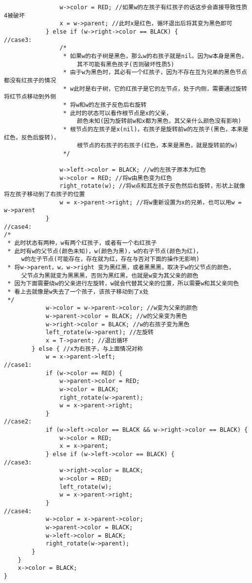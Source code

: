 \begin{verbatim}
                w->color = RED; //如果w的左孩子有红孩子的话这步会直接导致性质4被破坏
                x = w->parent; //此时x是红色，循环退出后将其变为黑色即可
            } else if (w->right->color == BLACK) {
//case3:
                /*
                 * 如果w的右子树是黑色，那么w的右孩子就是nil。因为w本身是黑色，
                     其不可能有黑色孩子(否则破坏性质5)
                 * 由于w为黑色时，其必有一个红孩子，因为不存在互为兄弟的黑色节点都没有红孩子的情况
                 * w此时是右子树，它的红孩子是它的左节点，处于内侧，需要通过旋转将红节点移动到外侧
                 * 将w和w的左孩子反色后右旋转
                 * 此时的状态可以看作根节点是x的父亲，
                     颜色未知(因为旋转前w和x都为黑色，其父亲什么颜色没有影响)
                 * 根节点的左孩子是x(nil)，右孩子是旋转前w的左孩子(黑色，本来是红色，反色后旋转)，
                     根节点的右孩子的右孩子(红色，本来是黑色，就是旋转前的w)
                 */

                w->left->color = BLACK; //w的左孩子原本为红色
                w->color = RED; //将w由黑色变为红色
                right_rotate(w); //将w点和其左孩子反色然后右旋转，形状上就像将左孩子移动到了右孩子的位置
                w = x->parent->right; //将w重新设置为x的兄弟，也可以用w = w->parent
            }
//case4:
/*
 * 此时状态有两种，w有两个红孩子，或者有一个右红孩子
 * 此时有w的父节点(颜色未知)，w(颜色为黑)，w的右子节点(颜色为红)，
     w的左子节点(可能存在，存在就为红，存在与否对下面的操作无影响)
 * 将w->parent，w，w->right 变为黑红黑，或者黑黑黑，取决于w的父节点的颜色，
     父节点为黑就变为黑黑黑，否则为黑红黑，也就是w变为其父亲的颜色
 * 因为下面需要绕w的父亲进行左旋转，w就会代替其父亲的位置，所以需要w和其父亲同色
 * 看上去就像是w失去了一个孩子，该孩子移动到了x处
 */
            w->color = w->parent->color; //w变为父亲的颜色
            w->parent->color = BLACK; //w的父亲变为黑色
            w->right->color = BLACK; //w的右孩子变为黑色
            left_rotate(w->parent); //左旋转
            x = T->parent; //退出循环
        } else { //x为右孩子，与上面情况对称
            w = x->parent->left;
//case1:
            if (w->color == RED) {
                w->parent->color = RED;
                w->color = BLACK;
                right_rotate(w->parent);
                w = x->parent->right;
            }
//case2:
            if (w->left->color == BLACK && w->right->color == BLACK) {
                w->color = RED;
                x = x->parent;
            } else if (w->left->color == BLACK) {
//case3:
                w->right->color = BLACK;
                w->color = RED;
                left_rotate(w);
                w = x->parent->right;
            }
//case4:
            w->color = x->parent->color;
            w->parent->color = BLACK;
            w->left->color = BLACK;
            right_rotate(w->parent);
        }
    }
    x->color = BLACK;
}


\end{verbatim}
